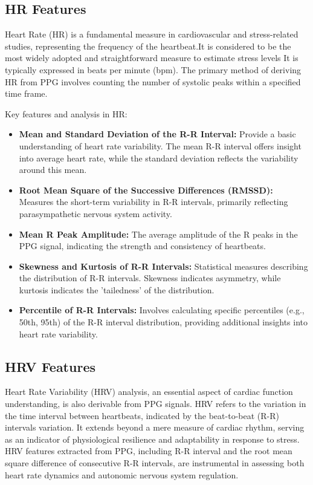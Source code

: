 \subsection*{HR Features}
Heart Rate (HR) is a fundamental measure in cardiovascular and stress-related studies, representing the frequency of the heartbeat.It is considered to be the most widely adopted and straightforward measure to estimate stress levels \parencite{review1} It is typically expressed in beats per minute (bpm). The primary method of deriving HR from PPG involves counting the number of systolic peaks within a specified time frame.

Key features and analysis in HR:
\begin{itemize}
  \item \textbf{Mean and Standard Deviation of the R-R Interval:} Provide a basic understanding of heart rate variability. The mean R-R interval offers insight into average heart rate, while the standard deviation reflects the variability around this mean.
  
  \item \textbf{Root Mean Square of the Successive Differences (RMSSD):} Measures the short-term variability in R-R intervals, primarily reflecting parasympathetic nervous system activity.
  
  \item \textbf{Mean R Peak Amplitude:} The average amplitude of the R peaks in the PPG signal, indicating the strength and consistency of heartbeats.
  
  \item \textbf{Skewness and Kurtosis of R-R Intervals:} Statistical measures describing the distribution of R-R intervals. Skewness indicates asymmetry, while kurtosis indicates the 'tailedness' of the distribution.
  
  \item \textbf{Percentile of R-R Intervals:} Involves calculating specific percentiles (e.g., 50th, 95th) of the R-R interval distribution, providing additional insights into heart rate variability.
\end{itemize}



\subsection*{HRV Features}
Heart Rate Variability (HRV) analysis, an essential aspect of cardiac function understanding, is also derivable from PPG signals. HRV refers to the variation in the time interval between heartbeats, indicated by the beat-to-beat (R-R) intervals variation. It extends beyond a mere measure of cardiac rhythm, serving as an indicator of physiological resilience and adaptability in response to stress. HRV features extracted from PPG, including R-R interval and the root mean square difference of consecutive R-R intervals, are instrumental in assessing both heart rate dynamics and autonomic nervous system regulation.


